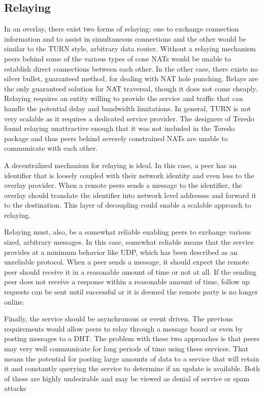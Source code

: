 \documentclass[conference]{IEEEtran}
\begin{document}
\subsection{Relaying}

In an overlay, there exist two forms of relaying:  one to exchange connection
information and to assist in simultaneous connections and the other would be
similar to the TURN style, arbitrary data router.  Without a relaying mechanism
peers behind some of the various types of cone NATs would be unable to
establish direct connections between each other.  In the other case, there
exists no silver bullet, guaranteed method, for dealing with NAT hole punching.
Relays are the only guaranteed solution for NAT traversal, though it does not
come cheaply.  Relaying requires an entity willing to provide the service and
traffic that can handle the potential delay and bandwidth limitations.  In
general, TURN is not very scalable as it requires a dedicated service provider.
The designers of Teredo found relaying unattractive enough that it was not
included in the Teredo package and thus peers behind severely constrained NATs
are unable to communicate with each other.

A decentralized mechanism for relaying is ideal.  In this case, a peer has an
identifier that is loosely coupled with their network identity and even less to
the overlay provider.  When a remote peers sends a message to the identifier,
the overlay should translate the identifier into network level addresses and
forward it to the destination.  This layer of decoupling could enable a
scalable approach to relaying.  

Relaying must, also, be a somewhat reliable enabling peers to exchange various
sized, arbitrary messages.  In this case, somewhat reliable means that the
service provides at a minimum behavior like UDP, which has been described as an
unreliable protocol.  When a peer sends a message, it should expect the remote
peer should receive it in a reasonable amount of time or not at all.  If the
sending peer does not receive a response within a reasonable amount of time,
follow up requests can be sent until successful or it is deemed the remote
party is no longer online.  

Finally, the service should be asynchronous or event driven.  The previous
requirements would allow peers to relay through a message board or even by
posting messages to a DHT.  The problem with these two approaches is that peers
may very well communicate for long periods of time using these services.  That
means the potential for posting large amounts of data to a service that will
retain it and constantly querying the service to determine if an update is
available.  Both of these are highly undesirable and may be viewed as denial of
service or spam attacks 
\end{document}

